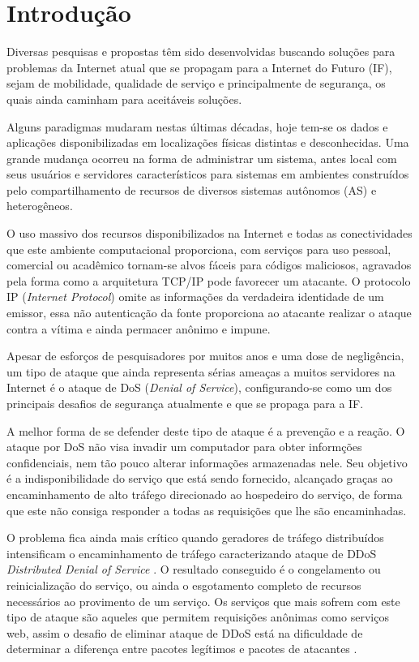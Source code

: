 \documentclass[a4paper, 12pt]{article}
\begin{document}
\section{Introdução}


Diversas pesquisas e propostas têm sido desenvolvidas buscando soluções para problemas da Internet atual que se propagam para a Internet do Futuro (IF), sejam de mobilidade, qualidade de serviço e principalmente de segurança, os quais ainda caminham para aceitáveis soluções.

Alguns paradigmas mudaram nestas últimas décadas, hoje tem-se os dados e aplicações disponibilizadas em localizações físicas distintas e desconhecidas. Uma grande mudança ocorreu na forma de administrar um sistema, antes local com seus usuários e servidores característicos para sistemas em ambientes construídos pelo compartilhamento de recursos de diversos sistemas autônomos (AS) e heterogêneos.

O uso massivo dos recursos disponibilizados na Internet e todas as conectividades que este ambiente computacional proporciona, com serviços para uso pessoal, comercial ou acadêmico tornam-se alvos fáceis para códigos maliciosos, agravados pela forma como a arquitetura TCP/IP pode favorecer um atacante. O protocolo IP (\emph{Internet Protocol}) omite as informações da verdadeira identidade de um emissor, essa não autenticação da fonte proporciona ao atacante realizar o ataque contra a vítima e ainda permacer anônimo e impune.

Apesar de esforços de pesquisadores por muitos anos e uma dose de negligência, um tipo de ataque que ainda representa sérias ameaças a muitos servidores na Internet é o ataque de DoS (\emph{Denial of Service}), configurando-se como um dos principais desafios de segurança atualmente e que se propaga para a IF. 


A melhor forma de se defender deste tipo de ataque é a prevenção e a reação. O ataque por DoS não visa invadir um computador para obter informções confidenciais, nem tão pouco alterar informações armazenadas nele. Seu objetivo é a indisponibilidade do serviço que está sendo fornecido, alcançado graças ao encaminhamento de alto tráfego direcionado ao hospedeiro do serviço, de forma que este não consiga responder a todas as requisições que lhe são encaminhadas. 

O problema fica ainda mais crítico quando geradores de tráfego distribuídos intensificam o encaminhamento de tráfego caracterizando ataque de DDoS \emph{Distributed Denial of Service} \cite{Sachdeva08ddosincidents}. O resultado conseguido é o congelamento ou reinicialização do serviço, ou ainda o esgotamento completo de recursos necessários ao provimento de um serviço. Os serviços que mais sofrem com este tipo de ataque são aqueles que permitem requisições anônimas como serviços web, assim o desafio de eliminar ataque de DDoS está na dificuldade de determinar a diferença entre pacotes legítimos e pacotes de atacantes \cite{Li:2009:DDA:1683304.1684620}.
\end{document}
